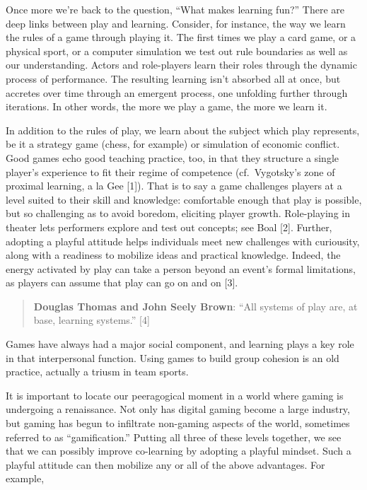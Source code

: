 Once more we're back to the question, ``What makes learning fun?'' There
are deep links between play and learning. Consider, for instance, the
way we learn the rules of a game through playing it. The first times we
play a card game, or a physical sport, or a computer simulation we test
out rule boundaries as well as our understanding. Actors and
role-players learn their roles through the dynamic process of
performance. The resulting learning isn't absorbed all at once, but
accretes over time through an emergent process, one unfolding further
through iterations. In other words, the more we play a game, the more we
learn it.

In addition to the rules of play, we learn about the subject which play
represents, be it a strategy game (chess, for example) or simulation of
economic conflict. Good games echo good teaching practice, too, in that
they structure a single player's experience to fit their regime of
competence (cf.~Vygotsky's zone of proximal learning, a la Gee
{{[}1{]}}). That is to say a game challenges players at a level suited
to their skill and knowledge: comfortable enough that play is possible,
but so challenging as to avoid boredom, eliciting player growth.
Role-playing in theater lets performers explore and test out concepts;
see Boal {{[}2{]}}. Further, adopting a playful attitude helps
individuals meet new challenges with curiousity, along with a readiness
to mobilize ideas and practical knowledge. Indeed, the energy activated
by play can take a person beyond an event's formal limitations, as
players can assume that play can go on and on {{[}3{]}}.

\begin{quote}
\textbf{Douglas Thomas and John Seely Brown}: ``All systems of play are,
at base, learning systems.'' {{[}4{]}}
\end{quote}

Games have always had a major social component, and learning plays a key
role in that interpersonal function. Using games to build group cohesion
is an old practice, actually a triusm in team sports.

It is important to locate our peeragogical moment in a world where
gaming is undergoing a renaissance. Not only has digital gaming become a
large industry, but gaming has begun to infiltrate non-gaming aspects of
the world, sometimes referred to as ``gamification.'' Putting all three
of these levels together, we see that we can possibly improve
co-learning by adopting a playful mindset. Such a playful attitude can
then mobilize any or all of the above advantages. For example,

